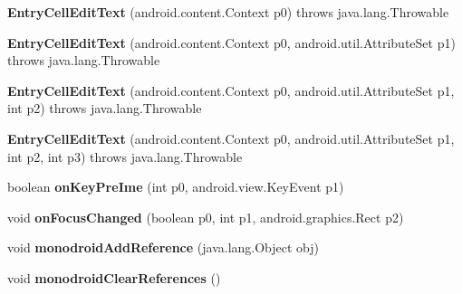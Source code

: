\begin{DoxyCompactItemize}
\item 
\mbox{\label{classmd5b60ffeb829f638581ab2bb9b1a7f4f3f_1_1_entry_cell_edit_text_a1f812c4dd4a8466916a56cd524846c26}} 
{\bfseries Entry\+Cell\+Edit\+Text} (android.\+content.\+Context p0)  throws java.\+lang.\+Throwable 	
\item 
\mbox{\label{classmd5b60ffeb829f638581ab2bb9b1a7f4f3f_1_1_entry_cell_edit_text_a1534671bdcadb40b84028d5077f27748}} 
{\bfseries Entry\+Cell\+Edit\+Text} (android.\+content.\+Context p0, android.\+util.\+Attribute\+Set p1)  throws java.\+lang.\+Throwable 	
\item 
\mbox{\label{classmd5b60ffeb829f638581ab2bb9b1a7f4f3f_1_1_entry_cell_edit_text_ad9ec4d4eb1721ae9dacee80558ac74bb}} 
{\bfseries Entry\+Cell\+Edit\+Text} (android.\+content.\+Context p0, android.\+util.\+Attribute\+Set p1, int p2)  throws java.\+lang.\+Throwable 	
\item 
\mbox{\label{classmd5b60ffeb829f638581ab2bb9b1a7f4f3f_1_1_entry_cell_edit_text_a859aeac3b874f8ae9f62a0be2671d9da}} 
{\bfseries Entry\+Cell\+Edit\+Text} (android.\+content.\+Context p0, android.\+util.\+Attribute\+Set p1, int p2, int p3)  throws java.\+lang.\+Throwable 	
\item 
\mbox{\label{classmd5b60ffeb829f638581ab2bb9b1a7f4f3f_1_1_entry_cell_edit_text_ae1f0f5abfb6ec318b45c3b0e65655095}} 
boolean {\bfseries on\+Key\+Pre\+Ime} (int p0, android.\+view.\+Key\+Event p1)
\item 
\mbox{\label{classmd5b60ffeb829f638581ab2bb9b1a7f4f3f_1_1_entry_cell_edit_text_ae96ee8d425aa2330f0e03f3e2e42aa1e}} 
void {\bfseries on\+Focus\+Changed} (boolean p0, int p1, android.\+graphics.\+Rect p2)
\item 
\mbox{\label{classmd5b60ffeb829f638581ab2bb9b1a7f4f3f_1_1_entry_cell_edit_text_ac2b60c2aace620dcf6c35e776cc89db4}} 
void {\bfseries monodroid\+Add\+Reference} (java.\+lang.\+Object obj)
\item 
\mbox{\label{classmd5b60ffeb829f638581ab2bb9b1a7f4f3f_1_1_entry_cell_edit_text_a3a4945fa7f86ca938cd71b78f446aa32}} 
void {\bfseries monodroid\+Clear\+References} ()
\end{DoxyCompactItemize}
